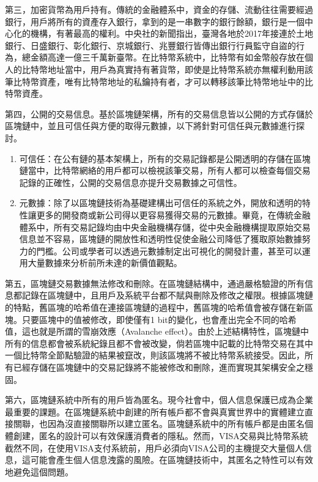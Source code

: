 				第三，加密貨幣為用戶持有。傳統的金融體系中，資金的存儲、流動往往需要經過銀行，用戶將所有的資產存入銀行，拿到的是一串數字的銀行餘額，銀行是一個中心化的機構，有著最高的權利。中央社的新聞\supercite{Bankguardsstolen}指出，臺灣各地於2017年接連於土地銀行、日盛銀行、彰化銀行、京城銀行、兆豐銀行皆傳出銀行行員監守自盜的行為，總金額高達一億三千萬新臺幣。在比特幣系統中，比特幣有如金幣般存放在個人的比特幣地址當中，用戶為真實持有著貨幣，即使是比特幣系統亦無權利動用該筆比特幣資產，唯有比特幣地址的私鑰持有者，才可以轉移該筆比特幣地址中的比特幣資產。

				第四，公開的交易信息。基於區塊鏈架構，所有的交易信息皆以公開的方式存儲於區塊鏈中，並且可信任與方便的取得元數據，以下將針對可信任與元數據進行探討。
				\begin{enumerate}
					\item 可信任：在公有鏈的基本架構上，所有的交易記錄都是公開透明的存儲在區塊鏈當中，比特幣網絡的用戶都可以檢視該筆交易，所有人都可以檢查每個交易記錄的正確性，公開的交易信息亦提升交易數據之可信性。
					\item 元數據：除了以區塊鏈技術為基礎建構出可信任的系統之外，開放和透明的特性讓更多的開發商或新公司得以更容易獲得交易的元數據。畢竟，在傳統金融體系中，所有交易記錄均由中央金融機構存儲，從中央金融機構提取原始交易信息並不容易，區塊鏈的開放性和透明性促使金融公司降低了獲取原始數據努力的門檻。公司或學者可以透過元數據制定出可視化的開發計畫，甚至可以運用大量數據來分析前所未達的新價值觀點。
				\end{enumerate}

				第五，區塊鏈交易數據無法修改和刪除。在區塊鏈結構中，通過嚴格驗證的所有信息都記錄在區塊鏈中，且用戶及系統平台都不賦與刪除及修改之權限。根據區塊鏈的特點，舊區塊的哈希值在連接區塊鏈的過程中，舊區塊的哈希值會被存儲在新區塊。只要區塊中的值被修改，即使僅有1 bit的變化，也會產出完全不同的哈希值，這也就是所謂的雪崩效應（Avalanche effect）\supercite{Theuseofbentsequencestoachievehigher-orderstrictavalanchecriterioninS-boxdesign}。由於上述結構特性，區塊鏈中所有的信息都會被系統紀錄且都不會被改變，倘若區塊中記載的比特幣交易在其中一個比特幣全節點驗證的結果被竄改，則該區塊將不被比特幣系統接受。因此，所有已經存儲在區塊鏈中的交易記錄將不能被修改和刪除，進而實現其架構安全之穩固。

				第六，區塊鏈系統中所有的用戶皆為匿名。現今社會中，個人信息保護已成為企業最重要的課題。在區塊鏈系統中創建的所有帳戶都不會與真實世界中的實體建立直接關聯，也因為沒直接關聯所以建立匿名。區塊鏈系統中的所有帳戶都是由匿名個體創建，匿名的設計可以有效保護消費者的隱私。然而，VISA交易與比特幣系統截然不同，在使用VISA支付系統前，用戶必須向VISA公司的主機提交大量個人信息，這可能會產生個人信息洩露的風險。在區塊鏈技術中，其匿名之特性可以有效地避免這個問題。

